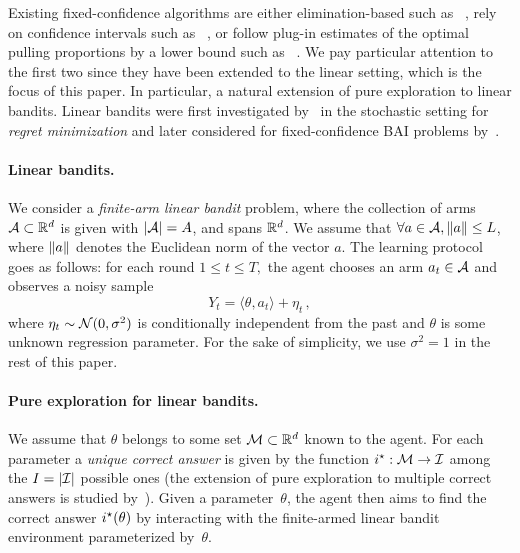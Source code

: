Existing fixed-confidence algorithms are either elimination-based such as \SE~\citep{karnin2013sha}, rely on confidence intervals such as \UGapE~\citep{gabillon2012ugape}, or follow plug-in estimates of the optimal pulling proportions by a lower bound such as \Track~\citep{garivier2016tracknstop}. We pay particular attention to the first two since they have been extended to the linear setting, which is the focus of this paper.
In particular, a natural extension of pure exploration to linear bandits. Linear bandits were first investigated by~\citet{auer2002linear} in the stochastic setting for \emph{regret minimization} and later considered for fixed-confidence BAI problems by~\citet{soare2014linear}.
\paragraph{Linear bandits.}
We consider a \emph{finite-arm linear bandit} problem, where the collection of arms $\mathcal{A}\subset \mathbb{R}^d$ is given  with $|\mathcal{A}|=A$, and spans $\mathbb{R}^d$. We assume that $\forall a\in\mathcal{A}, \left\lVert a\right\rVert\leq L$, where $\left\lVert a\right\rVert$ denotes the Euclidean norm of the vector $a$. The learning protocol goes as follows: for each round $1\leq t \leq T,$ the agent chooses an arm $a_t\in\mathcal{A}$ and observes a noisy sample
\[
Y_t =\langle \theta,a_t\rangle +\eta_t\,,
\]
where $\eta_t \sim \mathcal{N}(0,\sigma^2)$ is conditionally independent from the past and $\theta$ is some unknown regression parameter. For the sake of simplicity, we use $\sigma^2 = 1$ in the rest of this paper.

\paragraph{Pure exploration for linear bandits.}
We assume that $\theta$ belongs to some set $\mathcal{M}\subset\mathbb{R}^d$ known to the agent. %
For each parameter a \emph{unique correct answer} is given by the function $i^\star: \mathcal{M} \to \mathcal{I}$ among the $I = |\mathcal{I}|$ possible ones (the extension of pure exploration to multiple correct answers is studied by~\citealt{degenne2019pure}). Given a parameter~$\theta$, the agent then aims to find the correct answer $i^\star(\theta)$ by interacting with the finite-armed linear bandit environment parameterized by~$\theta$.

